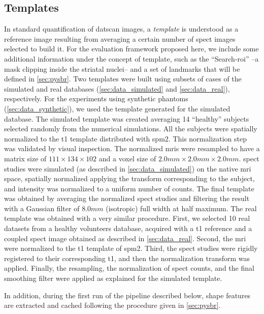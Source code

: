 \documentclass{frontiers}
\begin{document}
\subsection{Templates} %
\label{sec:data_templates}
\cbstart
In standard quantification of \gls*{datscan} images, a \emph{template} is understood as
  a reference image resulting from averaging a certain number of \gls*{spect}
  images selected to build it.
For the evaluation framework proposed here, we include some additional information
  under the concept of template, such as the ``Search-\gls*{roi}'' --a mask clipping inside
  the striatal nuclei-- and a set of landmarks that will be defined in \autoref{sec:pysbr}.
\cbend
Two templates were built using subsets of cases of the simulated and real
  databases (\autoref{sec:data_simulated} and \autoref{sec:data_real}), respectively.
For the experiments using synthetic phantoms (\autoref{sec:data_synthetic}),
  we used the template generated for the simulated database.
The simulated template was created averaging 14 ``healthy'' subjects selected randomly from
  the numerical simulations.
All the subjects were spatially normalized to the \gls*{t1} template distributed with
  \gls*{spm}2.
This normalization step was validated by visual inspection.
The normalized \glspl*{mri} were resampled to have a matrix size of
  $111\times134\times102$ and a voxel size of $2.0mm\times2.0mm\times2.0mm$.
\Gls*{spect} studies were simulated (as described in \autoref{sec:data_simulated})
  on the native \gls*{mri} space, spatially normalized applying the transform
  corresponding to the subject, and intensity was normalized to a
  uniform number of counts.
The final template was obtained by averaging the normalized \gls*{spect} studies
  and filtering the result with a Gaussian filter of $8.0mm$ (isotropic)
  full width at half maximum.
The real template was obtained with a very similar procedure. 
First, we selected 10 real datasets from a healthy volunteers database, acquired
  with a \gls*{t1} reference and a coupled \gls*{spect} image obtained as
  described in \autoref{sec:data_real}.
Second, the \gls*{mri} were normalized to the \gls*{t1} template of \gls*{spm}2.
Third, the \gls*{spect} studies were rigidly registered to their corresponding \gls*{t1}, 
  and then the normalization transform was applied.
Finally, the resampling, the normalization of \gls*{spect} counts, and the final
  smoothing filter were applied as explained for the simulated template.

In addition, during the first run of the pipeline described below, shape features 
  are extracted and cached following the procedure given in \autoref{sec:pysbr}.
\end{document}
